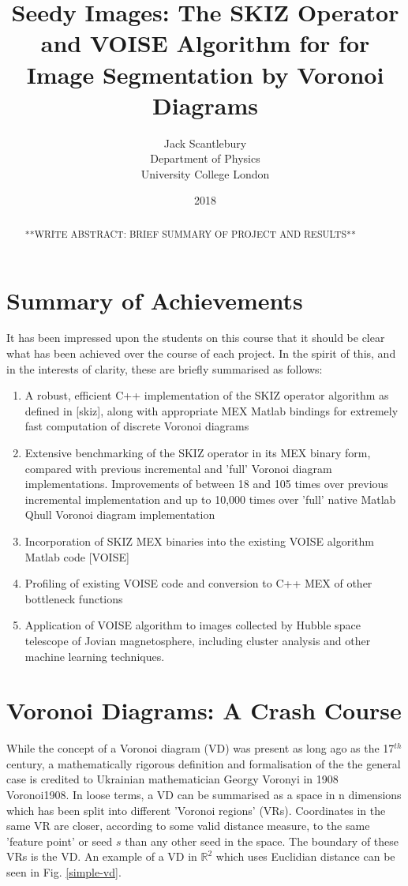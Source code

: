 \documentclass[12pt, report, a4paper, titlepage]{article}
\title{Seedy Images: The SKIZ Operator and VOISE Algorithm for for Image Segmentation by Voronoi Diagrams}
\author{Jack Scantlebury \\ Department of Physics\\ University College London}
\date{2018}
\numberwithin{equation}{section}
\newcommand*{\citen}{}%
\DeclareRobustCommand*{\citen}[1]{%
  \begingroup
    \romannumeral-`\x %
    \setcitestyle{numbers}%
    \cite{#1}%
  \endgroup
}
\begin{document}
\maketitle

\newpage
\tableofcontents
\newpage
\thispagestyle{fancy}

\begin{abstract}
    **WRITE ABSTRACT: BRIEF SUMMARY OF PROJECT AND RESULTS**
\end{abstract}

\section{Summary of Achievements}

It has been impressed upon the students on this course that it should be clear what has been achieved over the course of each project. In the spirit of this, and in the interests of clarity, these are briefly  summarised as follows:

\begin{enumerate}
	\item A robust, efficient C++ implementation of the SKIZ operator algorithm as defined in [\citen{skiz}], along with appropriate MEX Matlab bindings for extremely fast computation of discrete Voronoi diagrams
	\item Extensive benchmarking of the SKIZ operator in its MEX binary form, compared with previous incremental and 'full' Voronoi diagram implementations. Improvements of between 18 and 105 times over previous incremental implementation and up to 10,000 times over 'full' native Matlab Qhull Voronoi diagram implementation
	\item Incorporation of SKIZ MEX binaries into the existing VOISE algorithm Matlab code [\citen{VOISE}]
	\item Profiling of existing VOISE code and conversion to C++ MEX of other bottleneck functions
	\item Application of VOISE algorithm to images collected by Hubble space telescope of Jovian magnetosphere, including cluster analysis and other machine learning techniques.
\end{enumerate}
\section{Voronoi Diagrams: A Crash Course}

While the concept of a Voronoi diagram (VD) was present as long ago as the 17$^{th}$ century, a mathematically rigorous definition and formalisation of the the general case is credited to Ukrainian mathematician Georgy Voronyi in 1908 \citen{Voronoi1908}. In loose terms, a VD can be summarised as a space in n dimensions which has been split into different 'Voronoi regions' (VRs). Coordinates in the same VR are closer, according to some valid distance measure, to the same 'feature point' or seed $s$ than any other seed in the space. The boundary of these VRs is the VD. An example of a VD in $\mathbb{R}^2$ which uses Euclidian distance can be seen in Fig. \ref{simple-vd}.
\end{document}
